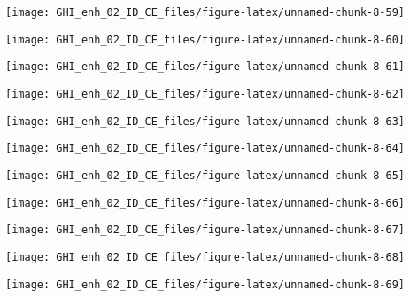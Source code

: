 \documentclass[
  10pt,
  a4paper,oneside]{article}
\begin{document}
\begin{center}\texttt{[image: GHI\_enh\_02\_ID\_CE\_files/figure-latex/unnamed-chunk-8-59]} \end{center}

\begin{center}\texttt{[image: GHI\_enh\_02\_ID\_CE\_files/figure-latex/unnamed-chunk-8-60]} \end{center}

\begin{center}\texttt{[image: GHI\_enh\_02\_ID\_CE\_files/figure-latex/unnamed-chunk-8-61]} \end{center}

\begin{center}\texttt{[image: GHI\_enh\_02\_ID\_CE\_files/figure-latex/unnamed-chunk-8-62]} \end{center}

\begin{center}\texttt{[image: GHI\_enh\_02\_ID\_CE\_files/figure-latex/unnamed-chunk-8-63]} \end{center}

\begin{center}\texttt{[image: GHI\_enh\_02\_ID\_CE\_files/figure-latex/unnamed-chunk-8-64]} \end{center}

\begin{center}\texttt{[image: GHI\_enh\_02\_ID\_CE\_files/figure-latex/unnamed-chunk-8-65]} \end{center}

\begin{center}\texttt{[image: GHI\_enh\_02\_ID\_CE\_files/figure-latex/unnamed-chunk-8-66]} \end{center}

\begin{center}\texttt{[image: GHI\_enh\_02\_ID\_CE\_files/figure-latex/unnamed-chunk-8-67]} \end{center}

\begin{center}\texttt{[image: GHI\_enh\_02\_ID\_CE\_files/figure-latex/unnamed-chunk-8-68]} \end{center}

\begin{center}\texttt{[image: GHI\_enh\_02\_ID\_CE\_files/figure-latex/unnamed-chunk-8-69]} \end{center}
\end{document}
